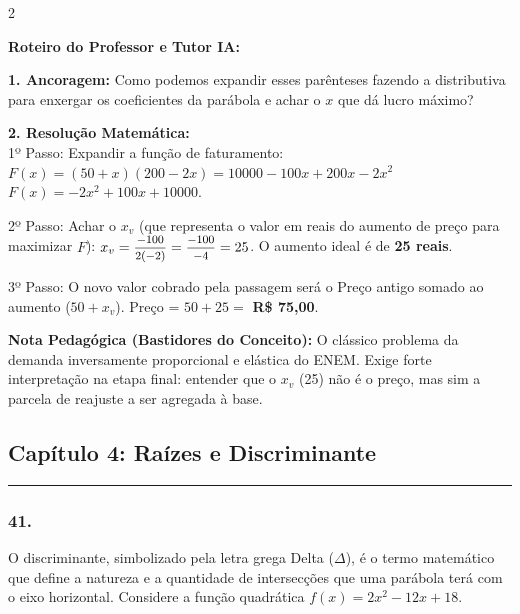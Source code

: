 \begin{multicols*}{2}
\ifgabarito
    \begin{tcolorbox}[colback=CorTitUm!5, colframe=CorTitUm, boxrule=1pt, arc=4pt, left=6pt, right=6pt, top=6pt, bottom=6pt]
    \small\textbf{\textcolor{CorTitUm}{Roteiro do Professor e Tutor IA:}}\par\vspace{0.1cm}
    \color{CinzaEscuro}
    \textbf{1. Ancoragem:} Como podemos expandir esses parênteses fazendo a distributiva para enxergar os coeficientes da parábola e achar o $x$ que dá lucro máximo?\par\vspace{0.1cm}
    \textbf{2. Resolução Matemática:}\\
    1º Passo: Expandir a função de faturamento:
    $F(x) = (50 + x)(200 - 2x) = 10000 - 100x + 200x - 2x^2$
    $F(x) = -2x^2 + 100x + 10000$.
    
    2º Passo: Achar o $x_v$ (que representa o valor em reais do aumento de preço para maximizar $F$):
    $x_v = \mfrac{-100}{2(-2)} = \mfrac{-100}{-4} = 25$.
    O aumento ideal é de \textbf{25 reais}.
    
    3º Passo: O novo valor cobrado pela passagem será o Preço antigo somado ao aumento ($50 + x_v$).
    Preço = $50 + 25 = $ \textbf{R\$ 75,00}.
    \end{tcolorbox}
    \vspace{0.15cm}
    
    \begin{boxexplicacao}
    \textbf{Nota Pedagógica (Bastidores do Conceito):} O clássico problema da demanda inversamente proporcional e elástica do ENEM. Exige forte interpretação na etapa final: entender que o $x_v$ (25) não é o preço, mas sim a parcela de reajuste a ser agregada à base.
    \end{boxexplicacao}
\fi

\par\vspace{\espacoQuestao}
\subsection*{Capítulo 4: Raízes e Discriminante}
\vspace{-0.2cm}\noindent\rule{\linewidth}{1.5pt} 
\par\vspace{\espacoPosTitulo}
\subsubsection*{41.} 
\begin{enunciadoLiteral}
O discriminante, simbolizado pela letra grega Delta ($\Delta$), é o termo matemático que define a natureza e a quantidade de intersecções que uma parábola terá com o eixo horizontal. Considere a função quadrática $f(x) = 2x^2 - 12x + 18$.


\end{enunciadoLiteral}
\end{multicols*}
